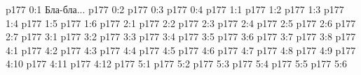 \author{Промежуточные создания}
\vs p177 0:1  Бла-бла...
\vs p177 0:2 
\vs p177 0:3 
\vs p177 0:4 
\vs p177 1:1 
\vs p177 1:2 
\vs p177 1:3 
\vs p177 1:4 
\vs p177 1:5 
\vs p177 1:6 
\vs p177 2:1 
\vs p177 2:2 
\vs p177 2:3 
\vs p177 2:4 
\vs p177 2:5 
\vs p177 2:6 \pc 
\vs p177 2:7 
\vs p177 3:1 
\vs p177 3:2 \pc 
\vs p177 3:3 \pc 
\vs p177 3:4 
\vs p177 3:5 \pc 
\vs p177 3:6 
\vs p177 3:7 \pc 
\vs p177 3:8 \pc 
{}
\vs p177 4:1 
\vs p177 4:2 
\vs p177 4:3 
\vs p177 4:4 
\vs p177 4:5 
\vs p177 4:6 
\vs p177 4:7 
\vs p177 4:8 
\vs p177 4:9 
\vs p177 4:10 
\vs p177 4:11 
\vs p177 4:12 
\vs p177 5:1 
\vs p177 5:2 
\vs p177 5:3 
\vs p177 5:4 
\vs p177 5:5 
\vs p177 5:6 
\quizlink
